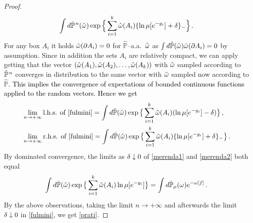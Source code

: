 \documentclass[12pt,a4paper,reqno]{amsart}
\newcommand{\bbP}{{\ensuremath{\mathbb P}} }
\newcommand{\bbR}{{\ensuremath{\mathbb R}} }
\let\D=\Delta \let\F=\Phi  \let\G=\Gamma  \let\L=\Lambda \let\The=\Theta
\let\O=\Omega \let\P=\Pi   \let\Ps=\Psi \let\Si=\Sigma \let\X=\Xi
\newcommand{\rosso}{\textcolor{black}} %
\newcommand{\da}{\downarrow}
\newcommand{\pn}{\rosso{{\hat\bbP}^{\hspace{0.03cm}n}}}
\begin{document}
\begin{proof}
\begin{multline}
 \int d \pn (\hat \o)\exp\Big\{ \sum_{i=1}^k \hat \o (A_i)  \{ \ln \mu[ e^{-g_i}] +\d \}_- \Big\}\,.
\end{multline}
For any  box $A_i$ it holds  $\hat {\omega} (\partial A_i)=0$ for $\hat \bbP$--a.a.~$\hat {\omega}$ as 
  $\int d \hat \bbP(\hat \o ) \hat \o (\partial A_i)=0$ by assumption.  Since in addition the sets $A_i$ are relatively compact, 
 we can apply \cite[Thm.~16.16]{Kal} getting that  the vector $(\hat {\omega} (A_1), \hat {\omega} (A_2), \dots , \hat {\omega} (A_k))$ with $\hat {\omega}$ sampled according to $\pn$  converges in distribution to the same vector with $\hat {\omega}$  sampled now according to $\hat\bbP$. \rosso{This implies the convergence of expectations of bounded continuous functions applied to the random  vectors. Hence we get}
  \begin{align}
 & \lim_{n\to +\infty} \text{l.h.s. of \eqref{fulmini}}= \int d \hat\bbP (\hat \o)\exp\big\{ \sum_{i=1}^k \hat \o (A_i)  (\ln \mu [ e^{-g_i}] -\d) \big\}\,, \label{merenda1}\\
  & \lim_{n\to +\infty} \text{r.h.s. of \eqref{fulmini}}= \int d \hat\bbP (\hat \o)\exp\big\{ \sum_{i=1}^k \hat \o (A_i)  \{ \ln \mu[ e^{-g_i}] +\d \}_- \big\}\,.\label{merenda2}
\end{align}
By dominated convergence,  the limits as $\d\da 0$ of \eqref{merenda1} and \eqref{merenda2} both equal
\[ \int d \hat\bbP (\hat \o)\exp\big\{ \sum_{i=1}^k \hat \o (A_i)   \ln \mu[ e^{-g_i}]  \big\}=\int d\hat \bbP_{\mu} (\o) e^{- \o [f]} \,.
\]
 By the above observations, taking the limit $n\to +\infty$ and afterwards the limit  $\d \da 0$ in \eqref{fulmini}, we get \eqref{prati}.

\end{proof}
\end{document}
